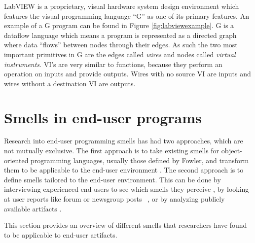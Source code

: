 \documentclass[10pt,conference,compsocconf]{IEEEtran}
\begin{document}
LabVIEW is a proprietary, visual hardware system design environment which features the visual programming language ``G'' as one of its primary features.
An example of a G program can be found in Figure \ref{fig:labviewexample}.
G is a dataflow language which means a program is represented as a directed graph where data ``flows'' between nodes through their edges.
As such the two most important primitives in G are the edges called \textit{wires} and nodes called \textit{virtual instruments}.
VI's are very similar to functions, because they perform an operation on inputs and provide outputs.
Wires with no source VI are inputs and wires without a destination VI are outputs. 


\section{Smells in end-user programs}
\label{sec:smells}
Research into end-user programming smells has had two approaches, which are not mutually exclusive.
The first approach is to take existing smells for object-oriented programming languages, usually those defined by Fowler, and transform them to be applicable to the end-user environment \cite{Hermans2012inter,Hermans2012intra,Stolee2011,StoleeTSE2013}.
The second approach is to define smells tailored to the end-user environment.
This can be done by interviewing experienced end-users to see which smells they perceive \cite{chambers2013smell}, by looking at user reports like forum or newsgroup posts~ \cite{badame2012refactoring,chambers2013smell}, or by analyzing publicly available artifacts \cite{Stolee2011,StoleeTSE2013}.

This section provides an overview of different smells that researchers have found to be applicable to end-user artifacts.
\end{document}
